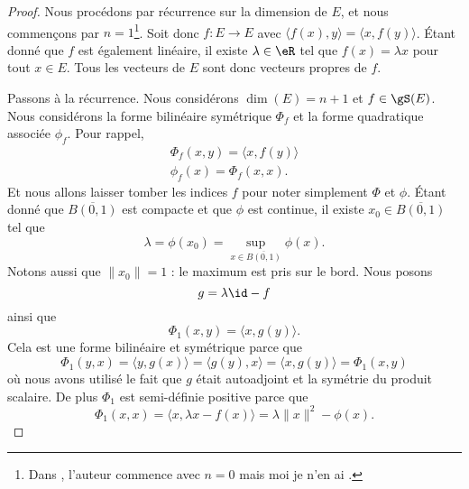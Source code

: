 \begin{proof}
    Nous procédons par récurrence sur la dimension de \( E\), et nous commençons par \( n=1\)\footnote{Dans \cite{KXjFWKA}, l'auteur commence avec \( n=0\) mais moi je n'en ai .}. Soit donc \( f\colon E\to E\) avec \( \langle f(x), y\rangle =\langle x, f(y)\rangle \). Étant donné que \( f\) est également linéaire, il existe \( \lambda\in \eR\) tel que \( f(x)=\lambda x\) pour tout \( x\in E\). Tous les vecteurs de \( E\) sont donc vecteurs propres de \( f\).

    Passons à la récurrence. Nous considérons \( \dim(E)=n+1\) et \( f\in\gS(E)\). Nous considérons la forme bilinéaire symétrique \( \Phi_f\) et la forme quadratique associée \( \phi_f\). Pour rappel,
    \begin{subequations}
        \begin{align}
        \Phi_f(x,y)=\langle x, f(y)\rangle \\
        \phi_f(x)=\Phi_f(x,x).
        \end{align}
    \end{subequations}
    Et nous allons laisser tomber les indices \( f\) pour noter simplement \( \Phi\) et \( \phi\). Étant donné que \( \overline{ B(0,1) }\) est compacte et que \( \phi\) est continue, il existe \( x_0\in\overline{ B(0,1) }\) tel que
    \begin{equation}
        \lambda=\phi(x_0)=\sup_{x\in\overline{ B(0,1) }}\phi(x).
    \end{equation}
    Notons aussi que \( \| x_0 \|=1\) : le maximum est pris sur le bord. Nous posons
    \begin{equation}
        g=\lambda\id-f
    \end{equation}
    ainsi que
    \begin{equation}
        \Phi_1(x,y)=\langle x, g(y)\rangle .
    \end{equation}
    Cela est une forme bilinéaire et symétrique parce que
    \begin{equation}
        \Phi_1(y,x)=\langle y, g(x)\rangle =\langle g(y), x\rangle =\langle x, g(y)\rangle =\Phi_1(x,y)
    \end{equation}
    où nous avons utilisé le fait que \( g\) était autoadjoint et la symétrie du produit scalaire. De plus \( \Phi_1\) est semi-définie positive parce que
    \begin{equation}
        \Phi_1(x,x)=\langle x, \lambda x-f(x)\rangle =\lambda\| x \|^2-\phi(x).
    \end{equation}

\end{proof}
